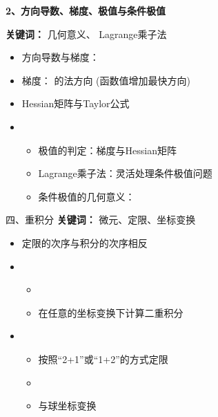 \begin{frame}
	\linespread{1.2}
	{\bf 2、方向导数、梯度、极值与条件极值} 
	
	{\b{\bf 关键词：} 几何意义、 Lagrange乘子法} 
	\begin{itemize}
	  \item 方向导数与梯度：  
	  \item 梯度： 的法方向 (函数值增加最快方向)
	  \item {\color{gray!50!white} Hessian矩阵与Taylor公式}
	  \item {}
	  \begin{itemize}
	    \item 极值的判定：梯度与Hessian矩阵
	    \item Lagrange乘子法：灵活处理条件极值问题
	    \item 条件极值的几何意义：
	  \end{itemize}
	\end{itemize}
\end{frame}

\begin{frame}{四、重积分}
	\linespread{1.2} 
	{\b{\bf 关键词：} 微元、定限、坐标变换} 
	\begin{itemize}
	  \item 定限的次序与积分的次序相反
	  \item {}
	  \begin{itemize}
	    \item {}\\
	    \item {\color{gray!50!white} 在任意的坐标变换下计算二重积分}
	  \end{itemize}
	  \item {}
	  \begin{itemize}
	    \item 按照“2+1”或“1+2”的方式定限
	    \item {}
	    \item {}与球坐标变换
	  \end{itemize}
	\end{itemize}
\end{frame}

